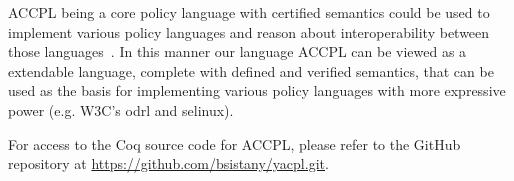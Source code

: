 \ac{ACCPL} being a core policy language with certified semantics could be used to implement various policy languages and reason about interoperability between those languages~\cite{prados2005interoperability, maronas2009architecture}. In this manner our language \ac{ACCPL} can be viewed as a extendable language, complete with defined and verified semantics, that can be used as the basis for implementing various policy languages with more expressive power (e.g. W3C's \ac{odrl} and \ac{selinux}). 

For access to the Coq source code for \ac{ACCPL}, please refer to the GitHub repository at \url{https://github.com/bsistany/yacpl.git}.














